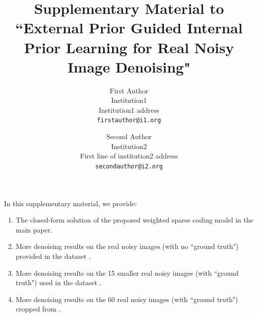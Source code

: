 \documentclass[10pt,onecolumn,letterpaper]{article}
\begin{document}
\title{Supplementary Material to ``External Prior Guided Internal Prior Learning for Real Noisy Image Denoising"}

\author{First Author\\
Institution1\\
Institution1 address\\
{\tt\small firstauthor@i1.org}
\and
Second Author\\
Institution2\\
First line of institution2 address\\
{\tt\small secondauthor@i2.org}
}

\maketitle


In this supplementary material, we provide:\vspace{-0.1in}
\begin{enumerate}
\item The closed-form solution of the proposed weighted sparse coding model in the main paper.
\vspace{-0.1in}
\item More denoising results on the real noisy images (with no ``ground truth") provided in the dataset \cite{ncwebsite}.
\vspace{-0.1in}
\item More denoising results on the 15 smaller real noisy images (with ``ground truth") used in the dataset \cite{crosschannel2016}.
\vspace{-0.1in}
\item More denoising results on the 60 real noisy images (with ``ground truth") cropped from \cite{crosschannel2016}.
\end{enumerate}
\end{document}
